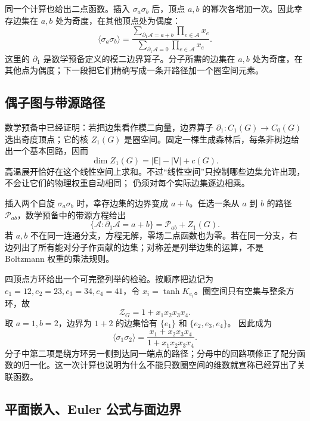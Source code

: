 同一个计算也给出二点函数。插入 \(\sigma_a\sigma_b\) 后，顶点 \(a,b\) 的幂次各增加一次。因此幸存边集在 \(a,b\) 处为奇度，在其他顶点处为偶度：
\begin{equation}
\langle\sigma_a\sigma_b\rangle
=\frac{\displaystyle
\sum_{\partial_1\mathscr A=a+b}\prod_{e\in\mathscr A}x_e}
{\displaystyle
\sum_{\partial_1\mathscr A=0}\prod_{e\in\mathscr A}x_e}.
\label{eq:phys-sm-correlation-expansion}
\end{equation}
这里的 \(\partial_1\) 是数学预备定义的模二边界算子。分子所需的边集在 \(a,b\) 处为奇度，在其他点为偶度；下一段把它们精确写成一条开路径加一个圈空间元素。

\subsection{偶子图与带源路径}

数学预备中已经证明：若把边集看作模二向量，边界算子 \(\partial_1:C_1(G)\to C_0(G)\) 选出奇度顶点；它的核 \(Z_1(G)\) 是圈空间。固定一棵生成森林后，每条非树边给出一个基本回路，因而
\[
\dim Z_1(G)=|\mathsf E|-|\mathsf V|+c(G).
\]
高温展开恰好在这个线性空间上求和。不过“线性空间”只控制哪些边集允许出现，不会让它们的物理权重自动相同； 仍须对每个实际边集逐边相乘。

插入两个自旋 \(\sigma_a\sigma_b\) 时，幸存边集的边界变成 \(a+b\)。任选一条从 \(a\) 到 \(b\) 的路径 \(\mathscr P_{ab}\)，数学预备中的带源方程给出
\begin{equation}
\{\mathscr A:\partial_1\mathscr A=a+b\}
=\mathscr P_{ab}+Z_1(G).
\label{eq:phys-sm-affine-cycle-coset}
\end{equation}
若 \(a,b\) 不在同一连通分支，方程无解，零场二点函数也为零。若在同一分支，右边列出了所有能对分子作贡献的边集；对称差是列举边集的运算，不是 Boltzmann 权重的乘法规则。

四顶点方环给出一个可完整列举的检验。按顺序把边记为 \(e_1=12,e_2=23,e_3=34,e_4=41\)，令 \(x_i=\tanh K_{e_i}\)。圈空间只有空集与整条方环，故
\[
\mathcal Z_G=1+x_1x_2x_3x_4.
\]
取 \(a=1,b=2\)，边界为 \(1+2\) 的边集恰有 \(\{e_1\}\) 和 \(\{e_2,e_3,e_4\}\)。 因此成为
\[
\langle\sigma_1\sigma_2\rangle
=\frac{x_1+x_2x_3x_4}{1+x_1x_2x_3x_4}.
\]
分子中第二项是绕方环另一侧到达同一端点的路径；分母中的回路项修正了配分函数的归一化。这一次计算也说明为什么不能只数圈空间的维数就宣称已经算出了关联函数。

\subsection{平面嵌入、Euler 公式与面边界}
\label{sec:phys-sm-planar-duality}

